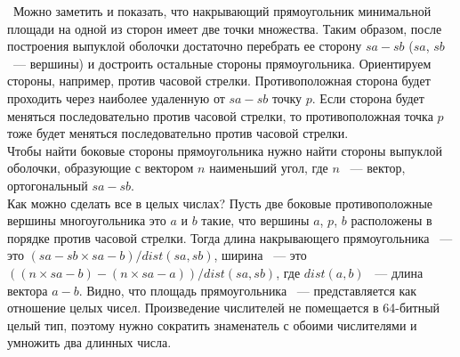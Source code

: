 \indent\indent\ Можно заметить и показать, что накрывающий
прямоугольник минимальной площади на одной из сторон
имеет две точки множества. Таким образом, после построения выпуклой оболочки
достаточно перебрать ее сторону $sa-sb$
($sa$, $sb$ ~--- вершины) и достроить остальные стороны
прямоугольника. Ориентируем стороны, например,
против часовой стрелки. Противоположная сторона будет проходить
через наиболее удаленную от $sa-sb$ точку $p$. Если сторона будет меняться
последовательно против часовой стрелки, то противоположная точка $p$ тоже
будет меняться последовательно против часовой стрелки.\\
Чтобы найти боковые стороны прямоугольника нужно найти стороны
выпуклой оболочки, образующие с вектором $n$ наименьший угол,
где $n$ ~--- вектор, ортогональный $sa-sb$.\\

Как можно сделать все в целых числах? Пусть две боковые
противоположные вершины многоугольника это $a$ и $b$ такие,
что вершины $a$, $p$, $b$ расположены в порядке против часовой
стрелки. Тогда длина накрывающего прямоугольника ~---
это $(sa-sb \times sa-b) / dist(sa, sb)$,
ширина ~--- это $((n \times sa-b) - (n \times sa-a)) / dist(sa, sb)$,
где $dist(a, b)$ ~--- длина вектора $a-b$. Видно, что
площадь прямоугольника ~--- представляется как отношение
целых чисел. Произведение числителей не помещается в 64-битный
целый тип, поэтому нужно сократить знаменатель с обоими числителями
и умножить два длинных числа.
